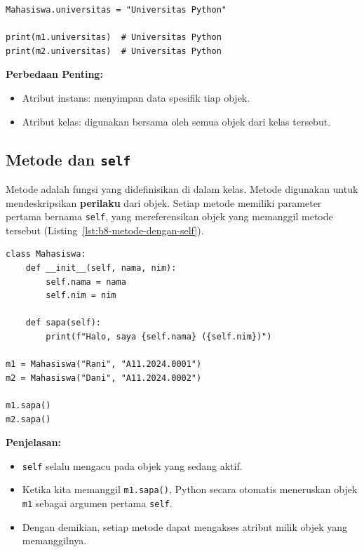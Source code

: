 \begin{lstlisting}[style=PythonStyle, caption={Perubahan Atribut Kelas}, label={lst:b8-perubahan-atribut-kelas}]
Mahasiswa.universitas = "Universitas Python"

print(m1.universitas)  # Universitas Python
print(m2.universitas)  # Universitas Python
\end{lstlisting}

\noindent\textbf{Perbedaan Penting:}
\begin{itemize}
    \item Atribut instans: menyimpan data spesifik tiap objek.
    \item Atribut kelas: digunakan bersama oleh semua objek dari kelas tersebut.
\end{itemize}

\subsection{Metode dan \texttt{self}}

Metode adalah fungsi yang didefinisikan di dalam kelas. Metode digunakan untuk mendeskripsikan \textbf{perilaku} dari objek.  
Setiap metode memiliki parameter pertama bernama \texttt{self}, yang mereferensikan objek yang memanggil metode tersebut (Listing~\ref{lst:b8-metode-dengan-self}).

\begin{lstlisting}[style=PythonStyle, caption={Metode dengan self}, label={lst:b8-metode-dengan-self}]
class Mahasiswa:
    def __init__(self, nama, nim):
        self.nama = nama
        self.nim = nim

    def sapa(self):
        print(f"Halo, saya {self.nama} ({self.nim})")

m1 = Mahasiswa("Rani", "A11.2024.0001")
m2 = Mahasiswa("Dani", "A11.2024.0002")

m1.sapa()
m2.sapa()
\end{lstlisting}

\noindent\textbf{Penjelasan:}
\begin{itemize}
    \item \texttt{self} selalu mengacu pada objek yang sedang aktif.
    \item Ketika kita memanggil \texttt{m1.sapa()}, Python secara otomatis meneruskan objek \texttt{m1} sebagai argumen pertama \texttt{self}.
    \item Dengan demikian, setiap metode dapat mengakses atribut milik objek yang memanggilnya.
\end{itemize}

